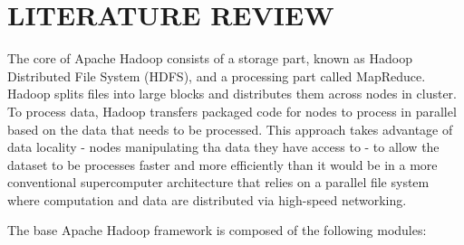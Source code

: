 \documentclass[a4paper,12pt,oneside]{report}
\begin{document}
\section{LITERATURE REVIEW}
The core of Apache Hadoop consists of a storage part, known as Hadoop Distributed File System (HDFS), and a processing part called MapReduce. Hadoop splits files into large blocks and distributes them across nodes in cluster. To process data, Hadoop transfers packaged code for nodes to process in parallel
based on the data that needs to be processed. This approach takes advantage of data locality - nodes manipulating tha data they have access to - to allow the dataset to be processes faster and more efficiently than it would be in a more conventional supercomputer architecture that relies on a parallel file 
system where computation and data are distributed via high-speed networking.
\par The base Apache Hadoop framework is composed of the following modules:
\end{document}
